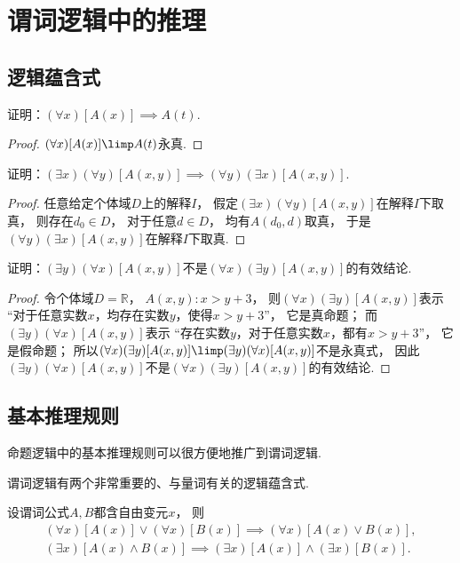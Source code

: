 \section{谓词逻辑中的推理}
\subsection{逻辑蕴含式}
\begin{example}
证明：\((\forall x)[A(x)] \implies A(t)\).
\begin{proof}
\((\forall x)[A(x)] \limp A(t)\)永真.
\end{proof}
\end{example}

\begin{example}
证明：\((\exists x)(\forall y)[A(x,y)] \implies (\forall y)(\exists x)[A(x,y)]\).
\begin{proof}
任意给定个体域\(D\)上的解释\(I\)，
假定\((\exists x)(\forall y)[A(x,y)]\)在解释\(I\)下取真，
则存在\(d_0 \in D\)，
对于任意\(d \in D\)，
均有\(A(d_0,d)\)取真，
于是\((\forall y)(\exists x)[A(x,y)]\)在解释\(I\)下取真.
\end{proof}
\end{example}

\begin{example}
证明：\((\exists y)(\forall x)[A(x,y)]\)不是\((\forall x)(\exists y)[A(x,y)]\)的有效结论.
\begin{proof}
令个体域\(D=\mathbb{R}\)，
\(A(x,y): x>y+3\)，
则\((\forall x)(\exists y)[A(x,y)]\)表示
“对于任意实数\(x\)，均存在实数\(y\)，使得\(x>y+3\)”，
它是真命题；
而\((\exists y)(\forall x)[A(x,y)]\)表示
“存在实数\(y\)，对于任意实数\(x\)，都有\(x>y+3\)”，
它是假命题；
所以\((\forall x)(\exists y)[A(x,y)] \limp (\exists y)(\forall x)[A(x,y)]\)不是永真式，
因此\((\exists y)(\forall x)[A(x,y)]\)不是\((\forall x)(\exists y)[A(x,y)]\)的有效结论.
\end{proof}
\end{example}

\subsection{基本推理规则}
命题逻辑中的基本推理规则可以很方便地推广到谓词逻辑.

谓词逻辑有两个非常重要的、与量词有关的逻辑蕴含式.
\begin{theorem}\label{theorem:一阶逻辑.基本推理规则}
设谓词公式\(A,B\)都含自由变元\(x\)，
则\begin{gather}
	(\forall x)[A(x)] \lor (\forall x)[B(x)]
	\implies (\forall x)[A(x) \lor B(x)], \\
	(\exists x)[A(x) \land B(x)]
	\implies (\exists x)[A(x)] \land (\exists x)[B(x)].
\end{gather}
\end{theorem}

